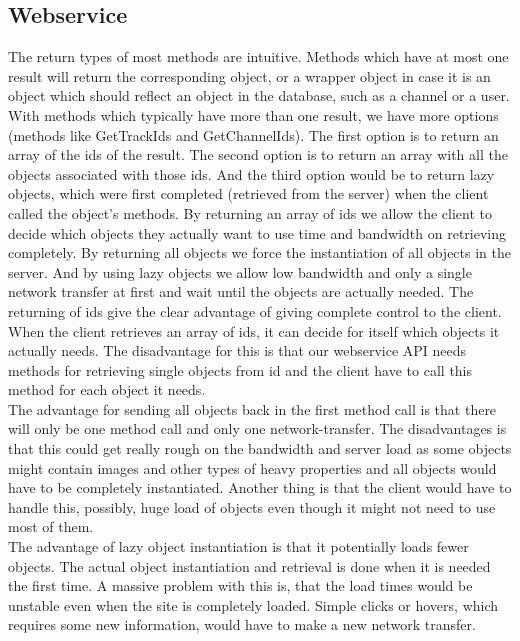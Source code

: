 \documentclass[a4paper,11pt,report]{article}
\begin{document}
\subsection{Webservice}
The return types of most methods are intuitive. Methods which have at most one result will return the corresponding object, or a wrapper object in case it is an object which should reflect an object in the database, such as a channel or a user. \\
With methods which typically have more than one result, we have more options (methods like GetTrackIds and GetChannelIds). 
The first option is to return an array of the ids of the result. The second option is to return an array with all the objects associated with those ids. And the third option would be to return lazy objects, which were first completed (retrieved from the server) when the client called the object's methods. By returning an array of ids we allow the client to decide which objects they actually want to use time and bandwidth on retrieving completely. By returning all objects we force the instantiation of all objects in the server. And by using lazy objects we allow low bandwidth and only a single network transfer at first and wait until the objects are actually needed.
The returning of ids give the clear advantage of giving complete control to the client. When the client retrieves an array of ids, it can decide for itself which objects it actually needs. The disadvantage for this is that our webservice API needs methods for retrieving single objects from id and the client have to call this method for each object it needs. \\
The advantage for sending all objects back in the first method call is that there will only be one method call and only one network-transfer. The disadvantages is that this could get really rough on the bandwidth and server load as some objects might contain images and other types of heavy properties and all objects would have to be completely instantiated. Another thing is that the client would have to handle this, possibly, huge load of objects even though it might not need to use most of them. \\
The advantage of lazy object instantiation is that it potentially loads fewer objects. The actual object instantiation and retrieval is done when it is needed the first time. A massive problem with this is, that the load times would be unstable even when the site is completely loaded. Simple clicks or hovers, which requires some new information, would have to make a new network transfer. \\
\end{document}

